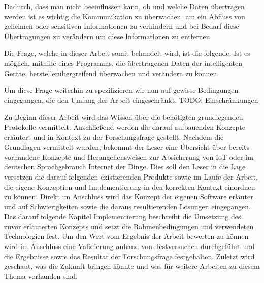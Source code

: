     Dadurch, dass man nicht beeinflussen kann, ob und welche Daten übertragen werden ist es wichtig die Kommunikation zu überwachen, um ein Abfluss von geheimen oder sensitiven Informationen zu verhindern und bei Bedarf diese Übertragungen zu verändern um diese Informationen zu entfernen.
    
    Die Frage, welche in dieser Arbeit somit behandelt wird, ist die folgende.
    Ist es möglich, mithilfe eines Programms, die übertragenen Daten der intelligenten Geräte, herstellerübergreifend überwachen und verändern zu können.
    
    Um diese Frage weiterhin zu spezifizieren wir nun auf gewisse Bedingungen eingegangen, die den Umfang der Arbeit eingeschränkt.
    TODO: Einschränkungen
    

    Zu Beginn dieser Arbeit wird das Wissen über die benötigten grundlegenden Protokolle vermittelt.
    Anschließend werden die darauf aufbauenden Konzepte erläutert und in Kontext zu der Forschungsfrage gestellt.
    Nachdem die Grundlagen vermittelt wurden, bekommt der Leser eine Übersicht über bereits vorhandene Konzepte und Herangehensweisen zur Absicherung von \ac{IoT} oder im deutschen Sprachgebrauch Internet der Dinge. Dies soll den Leser in die Lage versetzen die darauf folgenden existierenden Produkte sowie im Laufe der Arbeit, die eigene Konzeption und Implementierung in den korrekten Kontext einordnen zu können.
    Direkt im Anschluss wird das Konzept der eigenen Software erläuter und auf Schwierigkeiten sowie die daraus resultierenden Lösungen eingegangen. Das darauf folgende Kapitel \glqq Implementierung\grqq{} beschreibt die Umsetzung des zuvor erläuterten Konzepts und setzt die Rahmenbedingungen und verwendeten Technologien fest. Um den Wert vom Ergebnis der Arbeit bewerten zu können wird im Anschluss eine Validierung anhand von Testversuchen durchgeführt und die Ergebnisse sowie das Resultat der Forschungsfrage festgehalten. Zuletzt wird geschaut, was die Zukunft bringen könnte und was für weitere Arbeiten zu diesem Thema vorhanden sind.
